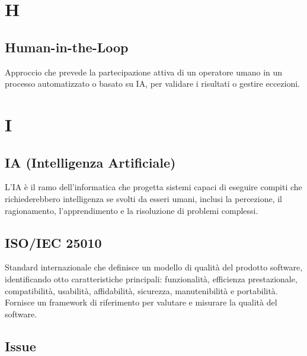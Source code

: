 \documentclass[a4paper, 11pt, oneside]{scrartcl} %
\begin{document}
\section*{H}

\subsection*{Human-in-the-Loop}
Approccio che prevede la partecipazione attiva di un operatore umano in un processo automatizzato o basato su IA, per validare i risultati o gestire eccezioni.
\vspace{0.5cm}


\section*{I}


\subsection*{IA (Intelligenza Artificiale)}
L'IA è il ramo dell'informatica che progetta sistemi capaci di eseguire compiti che richiederebbero intelligenza se svolti da esseri umani, inclusi la percezione, il ragionamento, l'apprendimento e la risoluzione di problemi complessi.
\vspace{0.5cm}

\subsection*{ISO/IEC 25010}
Standard internazionale che definisce un modello di qualità del prodotto software, identificando otto caratteristiche principali: funzionalità, efficienza prestazionale, compatibilità, usabilità, affidabilità, sicurezza, manutenibilità e portabilità. Fornisce un framework di riferimento per valutare e misurare la qualità del software.
\vspace{0.5cm}

\subsection*{Issue}

\end{document}
